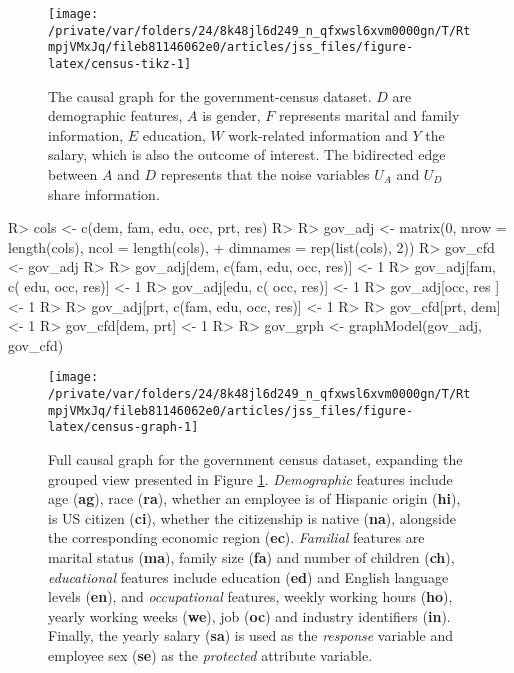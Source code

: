 \documentclass[
  nojss]{jss}
\begin{document}
\begin{CodeChunk}
\begin{figure}

{\centering \texttt{[image: /private/var/folders/24/8k48jl6d249\_n\_qfxwsl6xvm0000gn/T/RtmpjVMxJq/fileb81146062e0/articles/jss\_files/figure-latex/census-tikz-1]} 

}

\caption[The causal graph for the government-census dataset]{The causal graph for the government-census dataset. $D$ are demographic features, $A$ is gender, $F$ represents marital and family information, $E$ education, $W$ work-related information and $Y$ the salary, which is also the outcome of interest. The bidirected edge between $A$ and $D$ represents that the noise variables $U_A$ and $U_D$ share information.}\label{fig:census-tikz}
\end{figure}
\end{CodeChunk}

\begin{CodeChunk}
\begin{CodeInput}
R> cols <- c(dem, fam, edu, occ, prt, res)
R> 
R> gov_adj <- matrix(0, nrow = length(cols), ncol = length(cols),
+                   dimnames = rep(list(cols), 2))
R> gov_cfd <- gov_adj
R> 
R> gov_adj[dem, c(fam, edu, occ, res)] <- 1
R> gov_adj[fam, c(     edu, occ, res)] <- 1
R> gov_adj[edu, c(          occ, res)] <- 1
R> gov_adj[occ,                  res ] <- 1
R> 
R> gov_adj[prt, c(fam, edu, occ, res)] <- 1
R> 
R> gov_cfd[prt, dem] <- 1
R> gov_cfd[dem, prt] <- 1
R> 
R> gov_grph <- graphModel(gov_adj, gov_cfd)
\end{CodeInput}
\end{CodeChunk}

\begin{CodeChunk}
\begin{figure}

{\centering \texttt{[image: /private/var/folders/24/8k48jl6d249\_n\_qfxwsl6xvm0000gn/T/RtmpjVMxJq/fileb81146062e0/articles/jss\_files/figure-latex/census-graph-1]} 

}

\caption{Full causal graph for the government census dataset, expanding the grouped view presented in Figure \ref{fig:census-tikz}. \textit{Demographic} features include age (\textbf{ag}), race (\textbf{ra}), whether an employee is of Hispanic origin (\textbf{hi}), is US citizen (\textbf{ci}), whether the citizenship is native (\textbf{na}), alongside the corresponding economic region (\textbf{ec}). \textit{Familial} features are marital status (\textbf{ma}), family size (\textbf{fa}) and number of children (\textbf{ch}), \textit{educational} features include education (\textbf{ed}) and English language levels (\textbf{en}), and \textit{occupational} features, weekly working hours (\textbf{ho}), yearly working weeks (\textbf{we}), job (\textbf{oc}) and industry identifiers (\textbf{in}). Finally, the yearly salary (\textbf{sa}) is used as the \textit{response} variable and employee sex (\textbf{se}) as the \textit{protected} attribute variable.}\label{fig:census-graph}
\end{figure}
\end{CodeChunk}
\end{document}
